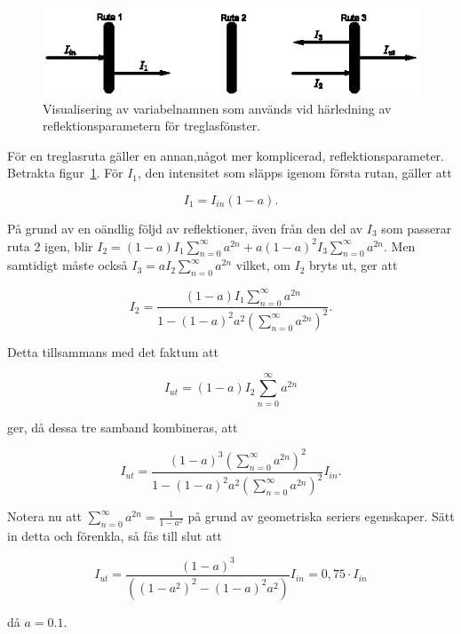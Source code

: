 \begin{figure}[hpbt]
\centering
\includegraphics[scale=2]{images/tripleglazing.eps}
\caption{Visualisering av variabelnamnen som används vid härledning av reflektionsparametern för treglasfönster.}
\label{fig:tripleglazing}
\end{figure}

För en treglasruta gäller en annan,något mer komplicerad, reflektionsparameter. Betrakta figur~\ref{fig:tripleglazing}. För $I_1$, den intensitet som släpps igenom första rutan, gäller att 

\begin{equation}
I_1=I_{in}\left( 1-a \right).
\end{equation}

På grund av en oändlig följd av reflektioner, även från den del av $I_3$ som passerar ruta 2 igen, blir $I_2 = \left( 1-a \right) I_1 \sum_{n=0}^{\infty} a^{2n} + a \left( 1-a \right)^2 I_3 \sum_{n=0}^{\infty} a^{2n}$. Men samtidigt måste också $I_3 = aI_2\sum_{n=0}^{\infty} a^{2n}$ vilket, om $I_2$ bryts ut, ger att

\begin{equation}
I_2 = \frac{\left( 1-a \right) I_1 \sum_{n=0}^{\infty} a^{2n}}{1-\left( 1-a \right)^2a^2\left(\sum_{n=0}^{\infty} a^{2n}\right)^2}.
\end{equation}

Detta tillsammans med det faktum att 

\begin{equation}
I_{ut} = \left( 1-a \right)I_2\sum_{n=0}^{\infty} a^{2n}
\end{equation}

ger, då dessa tre samband kombineras, att

\begin{equation}
I_{ut} = \frac{\left( 1-a \right)^3\left( \sum_{n=0}^{\infty} a^{2n}\right)^2}{1-\left( 1-a \right)^2a^2\left(\sum_{n=0}^{\infty} a^{2n}\right)^2}I_{in}.
\end{equation}

Notera nu att $\sum_{n=0}^{\infty} a^{2n} = \frac{1}{1-a^2}$ på grund av geometriska seriers egenskaper. Sätt in detta och förenkla, så fås till slut att

\begin{equation}
I_{ut} = \frac{\left( 1-a \right)^3}{\left(\left( 1-a^2\right)^2 - \left(1-a\right)^2 a^2\right)}I_{in} = 0,75 \cdot I_{in}
\end{equation}

då $a=0.1$.
